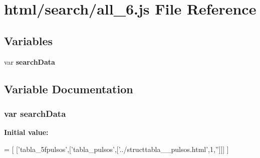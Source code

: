 \section{html/search/all\+\_\+6.js File Reference}
\label{all__6_8js}
\subsection*{Variables}
\begin{DoxyCompactItemize}
\item 
var {\bf search\+Data}
\end{DoxyCompactItemize}


\subsection{Variable Documentation}
\subsubsection[{search\+Data}]{\setlength{\rightskip}{0pt plus 5cm}var search\+Data}\label{all__6_8js_ad01a7523f103d6242ef9b0451861231e}
{\bfseries Initial value\+:}
\begin{DoxyCode}
=
[
  [\textcolor{stringliteral}{'tabla\_5fpulsos'},[\textcolor{stringliteral}{'tabla\_pulsos'},[\textcolor{stringliteral}{'../structtabla\_\_pulsos.html'},1,\textcolor{stringliteral}{''}]]]
]
\end{DoxyCode}
